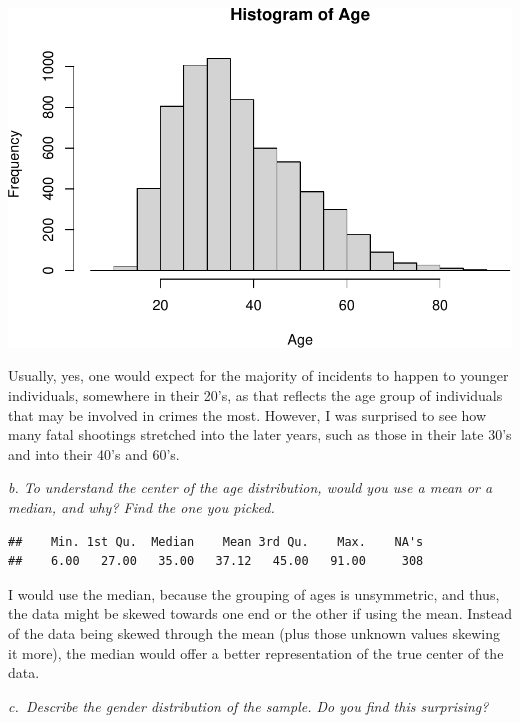 \documentclass[
]{article}
\newenvironment{Shaded}{\begin{snugshade}}{\end{snugshade}}
\newcommand{\FunctionTok}[1]{\textcolor[rgb]{0.00,0.00,0.00}{#1}}
\newcommand{\NormalTok}[1]{#1}
\newcommand{\SpecialCharTok}[1]{\textcolor[rgb]{0.00,0.00,0.00}{#1}}
\begin{document}
\includegraphics{Journal_files/figure-latex/unnamed-chunk-25-1.pdf}

Usually, yes, one would expect for the majority of incidents to happen
to younger individuals, somewhere in their 20's, as that reflects the
age group of individuals that may be involved in crimes the most.
However, I was surprised to see how many fatal shootings stretched into
the later years, such as those in their late 30's and into their 40's
and 60's.

\emph{b. To understand the center of the age distribution, would you use
a mean or a median, and why? Find the one you picked.}

\begin{Shaded}
\end{Shaded}

\begin{verbatim}
##    Min. 1st Qu.  Median    Mean 3rd Qu.    Max.    NA's 
##    6.00   27.00   35.00   37.12   45.00   91.00     308
\end{verbatim}

I would use the median, because the grouping of ages is unsymmetric, and
thus, the data might be skewed towards one end or the other if using the
mean. Instead of the data being skewed through the mean (plus those
unknown values skewing it more), the median would offer a better
representation of the true center of the data.

\emph{c.~Describe the gender distribution of the sample. Do you find
this surprising?}
\end{document}
